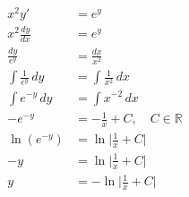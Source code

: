 \begin{align*}
    x^2 y' &= e^y \\
    x^2 \frac{dy}{dx} &= e^y \\
    \frac{dy}{e^y} &= \frac{dx}{x^2} \\
    \int \frac{1}{e^{y}} \, dy &= \int \frac{1}{x^{2}} \, dx \\
    \int e^{-y}\,dy &= \int x^{-2} \, dx \\
    -e^{-y} &= -\frac{1}{x} + C, \quad C \in \mathbb{R} \\
    \ln(e^{-y}) &= \ln \lvert \frac{1}{x} + C \rvert \\
    -y &= \ln \lvert \frac{1}{x} + C \rvert \\
    y &= -\ln \lvert \frac{1}{x} + C \rvert
\end{align*}
